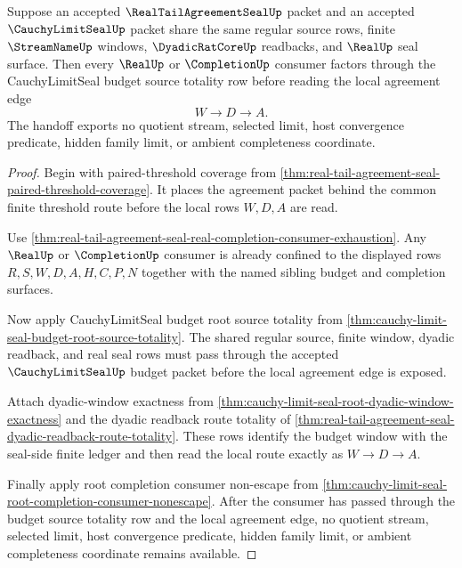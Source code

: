\begin{theorem}
\label{thm:real-tail-agreement-seal-cauchy-limit-budget-handoff}
Suppose an accepted $\RealTailAgreementSealUp$ packet and an accepted $\CauchyLimitSealUp$ packet share the same regular source rows, finite $\StreamNameUp$ windows, $\DyadicRatCoreUp$ readbacks, and $\RealUp$ seal surface. Then every $\RealUp$ or $\CompletionUp$ consumer factors through the CauchyLimitSeal budget source totality row before reading the local agreement edge
$$
W \to D \to A.
$$
The handoff exports no quotient stream, selected limit, host convergence predicate, hidden family limit, or ambient completeness coordinate.
\end{theorem}
\begin{proof}
Begin with paired-threshold coverage from \autoref{thm:real-tail-agreement-seal-paired-threshold-coverage}. It places the agreement packet behind the common finite threshold route before the local rows $W,D,A$ are read.

Use \autoref{thm:real-tail-agreement-seal-real-completion-consumer-exhaustion}. Any $\RealUp$ or $\CompletionUp$ consumer is already confined to the displayed rows $R,S,W,D,A,H,C,P,N$ together with the named sibling budget and completion surfaces.

Now apply CauchyLimitSeal budget root source totality from \autoref{thm:cauchy-limit-seal-budget-root-source-totality}. The shared regular source, finite window, dyadic readback, and real seal rows must pass through the accepted $\CauchyLimitSealUp$ budget packet before the local agreement edge is exposed.

Attach dyadic-window exactness from \autoref{thm:cauchy-limit-seal-root-dyadic-window-exactness} and the dyadic readback route totality of \autoref{thm:real-tail-agreement-seal-dyadic-readback-route-totality}. These rows identify the budget window with the seal-side finite ledger and then read the local route exactly as $W \to D \to A$.

Finally apply root completion consumer non-escape from \autoref{thm:cauchy-limit-seal-root-completion-consumer-nonescape}. After the consumer has passed through the budget source totality row and the local agreement edge, no quotient stream, selected limit, host convergence predicate, hidden family limit, or ambient completeness coordinate remains available.
\end{proof}

